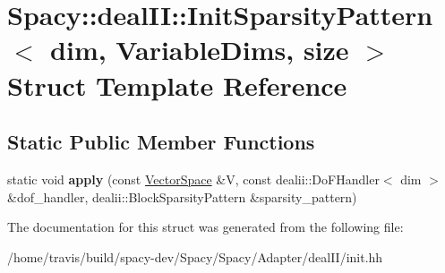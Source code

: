 \hypertarget{structSpacy_1_1dealII_1_1InitSparsityPattern}{\section{Spacy\-:\-:deal\-I\-I\-:\-:Init\-Sparsity\-Pattern$<$ dim, Variable\-Dims, size $>$ Struct Template Reference}
\label{structSpacy_1_1dealII_1_1InitSparsityPattern}
}
\subsection*{Static Public Member Functions}
\begin{DoxyCompactItemize}
\item 
\hypertarget{structSpacy_1_1dealII_1_1InitSparsityPattern_a08e919211ab719c01e25a810cab665d5}{static void {\bfseries apply} (const \hyperlink{classSpacy_1_1VectorSpace}{Vector\-Space} \&V, const dealii\-::\-Do\-F\-Handler$<$ dim $>$ \&dof\-\_\-handler, dealii\-::\-Block\-Sparsity\-Pattern \&sparsity\-\_\-pattern)}\label{structSpacy_1_1dealII_1_1InitSparsityPattern_a08e919211ab719c01e25a810cab665d5}

\end{DoxyCompactItemize}


The documentation for this struct was generated from the following file\-:\begin{DoxyCompactItemize}
\item 
/home/travis/build/spacy-\/dev/\-Spacy/\-Spacy/\-Adapter/deal\-I\-I/init.\-hh\end{DoxyCompactItemize}
